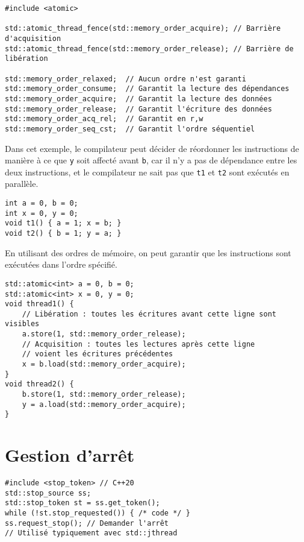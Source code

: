 \documentclass{article}
\newcommand{\cd}{\lstinline}
\begin{document}
\begin{multicols*}{3}
\begin{lstlisting}
#include <atomic>

std::atomic_thread_fence(std::memory_order_acquire); // Barrière d'acquisition
std::atomic_thread_fence(std::memory_order_release); // Barrière de libération

std::memory_order_relaxed;  // Aucun ordre n'est garanti
std::memory_order_consume;  // Garantit la lecture des dépendances
std::memory_order_acquire;  // Garantit la lecture des données
std::memory_order_release;  // Garantit l'écriture des données
std::memory_order_acq_rel;  // Garantit en r,w
std::memory_order_seq_cst;  // Garantit l'ordre séquentiel
\end{lstlisting}

Dans cet exemple, le compilateur peut décider de réordonner les instructions de manière à ce que \cd{y} soit affecté avant \cd{b}, car il n'y a pas de dépendance entre les deux instructions, et le compilateur ne sait pas que \cd{t1} et \cd{t2} sont exécutés en parallèle.

\begin{lstlisting}
int a = 0, b = 0;
int x = 0, y = 0;
void t1() { a = 1; x = b; }
void t2() { b = 1; y = a; }
\end{lstlisting}

En utilisant des ordres de mémoire, on peut garantir que les instructions sont exécutées dans l'ordre spécifié.

\begin{lstlisting}
std::atomic<int> a = 0, b = 0;
std::atomic<int> x = 0, y = 0;
void thread1() {
    // Libération : toutes les écritures avant cette ligne sont visibles
    a.store(1, std::memory_order_release);
    // Acquisition : toutes les lectures après cette ligne
    // voient les écritures précédentes
    x = b.load(std::memory_order_acquire);
}
void thread2() {
    b.store(1, std::memory_order_release);
    y = a.load(std::memory_order_acquire);
}
\end{lstlisting}

\section*{Gestion d'arrêt}
\begin{lstlisting}
#include <stop_token> // C++20
std::stop_source ss;
std::stop_token st = ss.get_token();
while (!st.stop_requested()) { /* code */ }
ss.request_stop(); // Demander l'arrêt
// Utilisé typiquement avec std::jthread
\end{lstlisting}


\end{multicols*}
\end{document}
